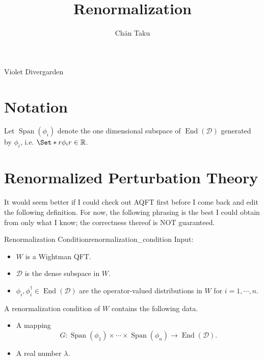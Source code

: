 \documentclass{article}
\title{Renormalization}
\author{Ch\=an Taku}
\begin{document}
\maketitle

\begin{center}
    \large \color{gray}
    Violet Divergarden
\end{center}

\section*{Notation}

Let $\operatorname{Span}(\phi_i)$ denote the one dimensional subspace of $\operatorname{End}(\mathcal{D})$ generated by $\phi_i$, i.e. $\Set*{r \phi_i}{r \in\mathbb{R}}$.

\section{Renormalized Perturbation Theory}

It would seem better if I could check out AQFT first before I come back and edit the following definition.
For now, the following phrasing is the best I could obtain from only what I know; the correctness thereof is NOT guaranteed.

\begin{definition}{Renormalization Condition}{renormalization_condition}
    Input:
    \begin{itemize}
        \item $W$ is a Wightman QFT.
        \item $\mathcal{D}$ is the dense subspace in $W$.
        \item $\phi_i,\phi^\dagger_i\in \operatorname{End}(\mathcal{D})$ are the operator-valued distributions in $W$ for $i=1,\cdots,n$.
    \end{itemize}
    A renormalization condition of $W$ contains the following data.
    \begin{itemize}
        \item A mapping
        \[ G: \operatorname{Span}(\phi_1) \times \cdots \times \operatorname{Span}(\phi_n) \rightarrow \operatorname{End}(\mathcal{D}). \]
        \item A real number $\lambda$.
    \end{itemize}
\end{definition}
\end{document}
